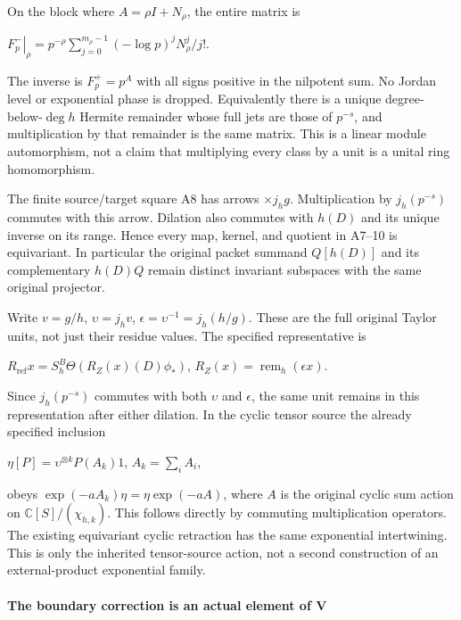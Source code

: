 On the block where \(A=\rho I+N_\rho\), the entire matrix is

\(\left.F_p^-\right|_\rho=p^{-\rho}\sum_{j=0}^{m_\rho-1}(-\log p)^j N_\rho^j/j!\).

The inverse is \(F_p^+=p^A\) with all signs positive in the nilpotent sum. No Jordan level or exponential phase is dropped. Equivalently there is a unique degree-below-\(\deg h\) Hermite remainder whose full jets are those of \(p^{-s}\), and multiplication by that remainder is the same matrix. This is a linear module automorphism, not a claim that multiplying every class by a unit is a unital ring homomorphism.

The finite source/target square A8 has arrows \(\times j_hg\). Multiplication by \(j_h(p^{-s})\) commutes with this arrow. Dilation also commutes with \(h(D)\) and its unique inverse on its range. Hence every map, kernel, and quotient in A7--10 is equivariant. In particular the original packet summand \(Q[h(D)]\) and its complementary \(h(D)Q\) remain distinct invariant subspaces with the same original projector.

Write \(v=g/h\), \(\upsilon=j_hv\), \(\epsilon=\upsilon^{-1}=j_h(h/g)\). These are the full original Taylor units, not just their residue values. The specified representative is

\(R_{\mathrm{ref}} x=S_h^B \Theta(R_Z(x)(D)\phi_*)\), \(R_Z(x)=\operatorname{rem}_h(\epsilon x)\).

Since \(j_h(p^{-s})\) commutes with both \(\upsilon\) and \(\epsilon\), the same unit remains in this representation after either dilation. In the cyclic tensor source the already specified inclusion

\(\eta[P]=\upsilon^{\otimes k} P(A_k)1\), \(A_k=\sum_i A_i\),

obeys \(\exp(-aA_k)\eta=\eta \exp(-aA)\), where \(A\) is the original cyclic sum action on \(\mathbb C[S]/(\chi_{h,k})\). This follows directly by commuting multiplication operators. The existing equivariant cyclic retraction has the same exponential intertwining. This is only the inherited tensor-source action, not a second construction of an external-product exponential family.

\paragraph{The boundary correction is an actual element of V}\label{endpoint-f1_scaling--the-boundary-correction-is-an-actual-element-of-v}

